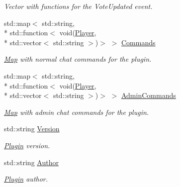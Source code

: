\begin{DoxyCompactItemize}
\begin{DoxyCompactList}\small\item\em Vector with functions for the Vote\-Updated event. \end{DoxyCompactList}\item 
std\-::map$<$ std\-::string, \\*
std\-::function$<$ void(\hyperlink{structPlayer}{Player}, \\*
std\-::vector$<$ std\-::string $>$)$>$ $>$ \hyperlink{classPlugin_a588dcd49b4fe45b3a401b749795b95fe}{Commands}
\begin{DoxyCompactList}\small\item\em \hyperlink{structMap}{Map} with normal chat commands for the plugin. \end{DoxyCompactList}\item 
std\-::map$<$ std\-::string, \\*
std\-::function$<$ void(\hyperlink{structPlayer}{Player}, \\*
std\-::vector$<$ std\-::string $>$)$>$ $>$ \hyperlink{classPlugin_a7a1ba3ed5e3c0c23eb1ea2e33cc61c1a}{Admin\-Commands}
\begin{DoxyCompactList}\small\item\em \hyperlink{structMap}{Map} with admin chat commands for the plugin. \end{DoxyCompactList}\item 
\hypertarget{classPlugin_a8e332303a494988d2444589ac21c3414}{std\-::string \hyperlink{classPlugin_a8e332303a494988d2444589ac21c3414}{Version}}\label{classPlugin_a8e332303a494988d2444589ac21c3414}

\begin{DoxyCompactList}\small\item\em \hyperlink{classPlugin}{Plugin} version. \end{DoxyCompactList}\item 
\hypertarget{classPlugin_a2b51c785a131a581164f2c82e83cb660}{std\-::string \hyperlink{classPlugin_a2b51c785a131a581164f2c82e83cb660}{Author}}\label{classPlugin_a2b51c785a131a581164f2c82e83cb660}

\begin{DoxyCompactList}\small\item\em \hyperlink{classPlugin}{Plugin} author. \end{DoxyCompactList}\end{DoxyCompactItemize}
